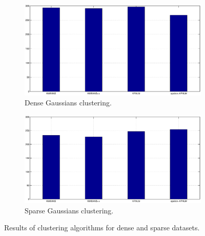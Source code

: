 \documentclass[12pt]{article}
\numberwithin{equation}{section}
\begin{document}
\begin{figure}
    \centering
    \begin{subfigure}[b]{0.45\textwidth}
        \includegraphics[width=\textwidth]{dense_gaussians_similarity}
        \caption{Dense Gaussians clustering.}
        \label{fig:dense_gaussians_similarity}
    \end{subfigure}
    \quad
    \begin{subfigure}[b]{0.45\textwidth}
        \includegraphics[width=\textwidth]{sparse_gaussians_similarity}
        \caption{Sparse Gaussians clustering.}
        \label{fig:sparse_gaussians_similarity}
    \end{subfigure}
    \caption{Results of clustering algorithms for dense and sparse datasets.}
    \label{fig:gaussians_similarity}
\end{figure}
\end{document}

